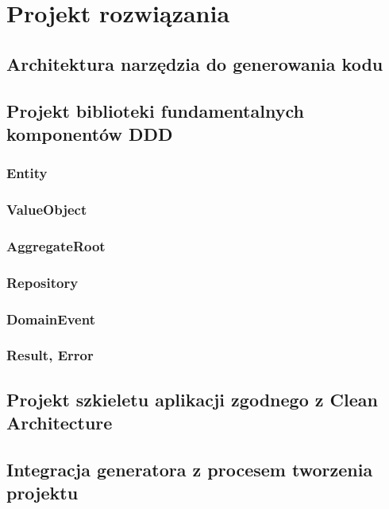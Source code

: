 \newpage
\section{Projekt rozwiązania}

\subsection{Architektura narzędzia do generowania kodu}

\subsection{Projekt biblioteki fundamentalnych komponentów DDD}

\subsubsection{Entity}
\subsubsection{ValueObject}
\subsubsection{AggregateRoot}
\subsubsection{Repository}
\subsubsection{DomainEvent}
\subsubsection{Result, Error}

\subsection{Projekt szkieletu aplikacji zgodnego z Clean Architecture}

\subsection{Integracja generatora z procesem tworzenia projektu}